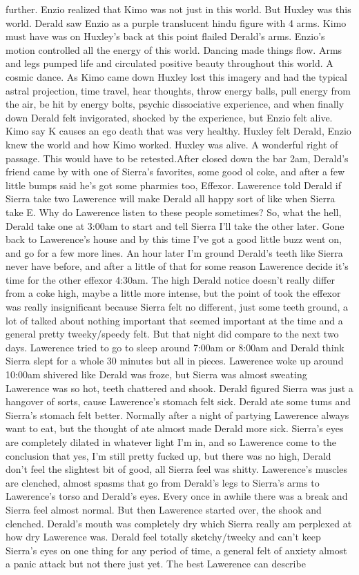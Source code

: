 \documentclass[12pt]{book}
\begin{document}
further. Enzio realized that Kimo was not just in this world. But Huxley was this world. Derald saw Enzio as a purple translucent hindu figure with 4 arms. Kimo must have was on Huxley's back at this point flailed Derald's arms. Enzio's motion controlled all the energy of this world. Dancing made things flow. Arms and legs pumped life and circulated positive beauty throughout this world. A cosmic dance. As Kimo came down Huxley lost this imagery and had the typical astral projection, time travel, hear thoughts, throw energy balls, pull energy from the air, be hit by energy bolts, psychic dissociative experience, and when finally down Derald felt invigorated, shocked by the experience, but Enzio felt alive. Kimo say K causes an ego death that was very healthy. Huxley felt Derald, Enzio knew the world and how Kimo worked. Huxley was alive. A wonderful right of passage. This would have to be retested.After closed down the bar 2am, Derald's friend came by with one of Sierra's favorites, some good ol coke, and after a few little bumps said he's got some pharmies too, Effexor. Lawerence told Derald if Sierra take two Lawerence will make Derald all happy sort of like when Sierra take E. Why do Lawerence listen to these people sometimes? So, what the hell, Derald take one at 3:00am to start and tell Sierra I'll take the other later. Gone back to Lawerence's house and by this time I've got a good little buzz went on, and go for a few more lines. An hour later I'm ground Derald's teeth like Sierra never have before, and after a little of that for some reason Lawerence decide it's time for the other effexor 4:30am. The high Derald notice doesn't really differ from a coke high, maybe a little more intense, but the point of took the effexor was really insignificant because Sierra felt no different, just some teeth ground, a lot of talked about nothing important that seemed important at the time and a general pretty tweeky/speedy felt. But that night did compare to the next two days. Lawerence tried to go to sleep around 7:00am or 8:00am and Derald think Sierra slept for a whole 30 minutes but all in pieces. Lawerence woke up around 10:00am shivered like Derald was froze, but Sierra was almost sweating Lawerence was so hot, teeth chattered and shook. Derald figured Sierra was just a hangover of sorts, cause Lawerence's stomach felt sick. Derald ate some tums and Sierra's stomach felt better. Normally after a night of partying Lawerence always want to eat, but the thought of ate almost made Derald more sick. Sierra's eyes are completely dilated in whatever light I'm in, and so Lawerence come to the conclusion that yes, I'm still pretty fucked up, but there was no high, Derald don't feel the slightest bit of good, all Sierra feel was shitty. Lawerence's muscles are clenched, almost spasms that go from Derald's legs to Sierra's arms to Lawerence's torso and Derald's eyes. Every once in awhile there was a break and Sierra feel almost normal. But then Lawerence started over, the shook and clenched. Derald's mouth was completely dry which Sierra really am perplexed at how dry Lawerence was. Derald feel totally sketchy/tweeky and can't keep Sierra's eyes on one thing for any period of time, a general felt of anxiety almost a panic attack but not there just yet. The best Lawerence can describe 
\end{document}
